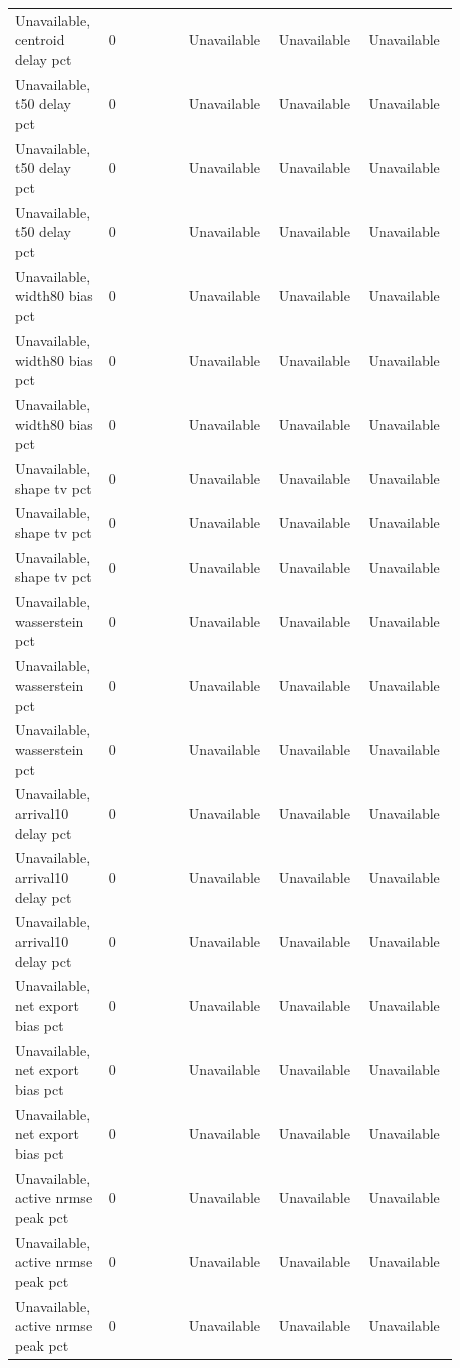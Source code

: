 \begin{longtable}{p{0.1760\linewidth}p{0.1760\linewidth}p{0.1760\linewidth}p{0.1760\linewidth}p{0.1760\linewidth}}
Unavailable, centroid delay pct & 0 & Unavailable & Unavailable & Unavailable \\
Unavailable, t50 delay pct & 0 & Unavailable & Unavailable & Unavailable \\
Unavailable, t50 delay pct & 0 & Unavailable & Unavailable & Unavailable \\
Unavailable, t50 delay pct & 0 & Unavailable & Unavailable & Unavailable \\
Unavailable, width80 bias pct & 0 & Unavailable & Unavailable & Unavailable \\
Unavailable, width80 bias pct & 0 & Unavailable & Unavailable & Unavailable \\
Unavailable, width80 bias pct & 0 & Unavailable & Unavailable & Unavailable \\
Unavailable, shape tv pct & 0 & Unavailable & Unavailable & Unavailable \\
Unavailable, shape tv pct & 0 & Unavailable & Unavailable & Unavailable \\
Unavailable, shape tv pct & 0 & Unavailable & Unavailable & Unavailable \\
Unavailable, wasserstein pct & 0 & Unavailable & Unavailable & Unavailable \\
Unavailable, wasserstein pct & 0 & Unavailable & Unavailable & Unavailable \\
Unavailable, wasserstein pct & 0 & Unavailable & Unavailable & Unavailable \\
Unavailable, arrival10 delay pct & 0 & Unavailable & Unavailable & Unavailable \\
Unavailable, arrival10 delay pct & 0 & Unavailable & Unavailable & Unavailable \\
Unavailable, arrival10 delay pct & 0 & Unavailable & Unavailable & Unavailable \\
Unavailable, net export bias pct & 0 & Unavailable & Unavailable & Unavailable \\
Unavailable, net export bias pct & 0 & Unavailable & Unavailable & Unavailable \\
Unavailable, net export bias pct & 0 & Unavailable & Unavailable & Unavailable \\
Unavailable, active nrmse peak pct & 0 & Unavailable & Unavailable & Unavailable \\
Unavailable, active nrmse peak pct & 0 & Unavailable & Unavailable & Unavailable \\
Unavailable, active nrmse peak pct & 0 & Unavailable & Unavailable & Unavailable \\

\end{longtable}
